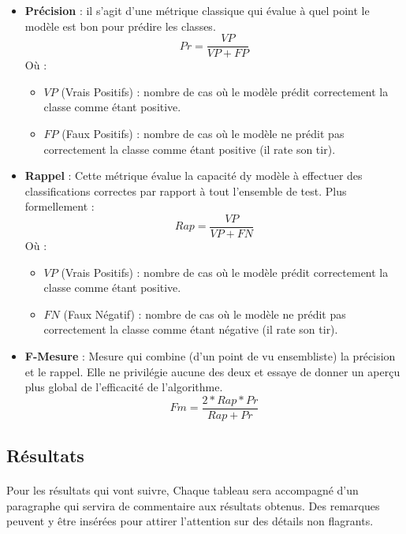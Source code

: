 	\begin{itemize}
		\item \textbf{Précision} : il s'agit d'une métrique classique qui évalue à quel point le modèle est bon pour prédire les classes.
		\begin{equation*}
			Pr = \frac{VP}{VP+FP}
		\end{equation*}
		Où : 
		\begin{itemize}
			\item $VP$ (Vrais Positifs) : nombre de cas où le modèle prédit correctement la classe comme étant positive.
			\item $FP$ (Faux Positifs) : nombre de cas où le modèle ne prédit pas correctement la classe comme étant positive (il rate son tir).
		\end{itemize}

		\item \textbf{Rappel} : Cette métrique évalue la capacité dy modèle à effectuer des classifications correctes par rapport à tout l'ensemble de test. Plus formellement : 
		\begin{equation*}
		Rap = \frac{VP}{VP+FN}
		\end{equation*}
		Où : 
		\begin{itemize}
			\item $VP$ (Vrais Positifs) : nombre de cas où le modèle prédit correctement la classe comme étant positive.
			\item $FN$ (Faux Négatif) : nombre de cas où le modèle ne prédit pas correctement la classe comme étant négative (il rate son tir).
		\end{itemize}
	
		\item \textbf{F-Mesure} : Mesure qui combine (d'un point de vu ensembliste) la précision et le rappel. Elle ne privilégie aucune des deux et essaye de donner un aperçu plus global de l'efficacité de l'algorithme.
		\begin{equation*}
		Fm = \frac{2*Rap*Pr}{Rap+Pr}
		\end{equation*}
	\end{itemize}
	\subsection{Résultats}
	\paragraph{}
	Pour les résultats qui vont suivre, Chaque tableau sera accompagné d'un paragraphe qui servira de commentaire aux résultats obtenus. Des remarques peuvent y être insérées pour attirer l'attention sur des détails non flagrants.
	
